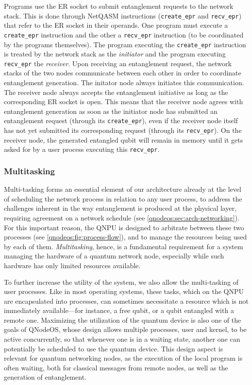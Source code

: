 Programs use the \ac{ER} socket to submit entanglement requests to the network stack. This is done through NetQASM instructions (\texttt{create\_epr} and \texttt{recv\_epr}) that refer to the \ac{ER} socket in their operands. One program must execute a \texttt{create\_epr} instruction and the other a \texttt{recv\_epr} instruction (to be coordinated by the programs themselves). The program executing the \texttt{create\_epr} instruction is treated by the network stack as the \emph{initiator} and the program executing \texttt{recv\_epr} the \emph{receiver}. 
Upon receiving an entanglement request, the network stacks of the two nodes communicate between each other in order to coordinate entanglement generation. The initator node always initiates this communication. The receiver node always accepts the entanglement initiative as long as the corresponding \ac{ER} socket is open. This means that the receiver node agrees with entanglement generation as soon as the initiator node has submitted an entanglement request (through its \texttt{create\_epr}), even if the receiver node itself has not yet submitted its corresponding request (through its \texttt{recv\_epr}). On the receiver node, the generated entangled qubit will remain in memory until it gets asked for by a user process executing this \texttt{recv\_epr}.

\subsubsection{Multitasking}

Multi-tasking forms an essential element of our architecture already at the level of scheduling the network process in relation to any user process, to address the challenges inherent in the way entanglement is produced at the physical layer, requiring agreement on a network schedule (see \cref{qnodeos:sec:arch-networking}). For this important reason, the \ac{QNPU} is designed to arbitrate between these two processes (see \cref{qnodeos:fig:process-flow}), and to manage the resources being used by each of them. \emph{Multitasking}, hence, is a fundamental requirement for a system managing the hardware of a quantum network node, especially while such hardware has only limited resources available. 

To further increase the utility of the system, we also allow the multi-tasking of user processes.
Like in most operating systems, these tasks, which on the \ac{QNPU} are encapsulated into processes, can sometimes necessitate a resource which is not immediately available---for instance, a free qubit, or a qubit entangled with a remote one. Maximizing the utilization of the quantum device is also one of the goals of \ac{QNodeOS}, whose design allows multiple processes, user and kernel, to be active concurrently, so that whenever one is in a waiting state, another one can potentially be scheduled to use the quantum device.  This design aspect is relevant for quantum networking nodes, as the execution of the local program is often waiting, both for classical messages from remote nodes, as well as the generation of entanglement. 

